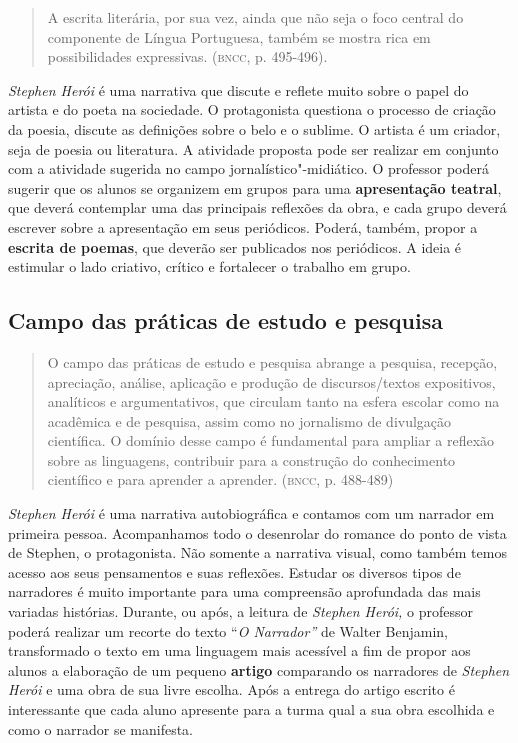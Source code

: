 \documentclass[12pt]{extarticle}
\begin{document}
{\begin{quote}
A escrita literária, por sua vez, ainda que não seja o foco central do
componente de Língua Portuguesa, também se mostra rica em possibilidades
expressivas. (\textsc{bncc}, p. 495-496).
\end{quote}

\emph{Stephen Herói} é uma narrativa que discute e reflete muito sobre
o papel do artista e do poeta na sociedade. O protagonista questiona o
processo de criação da poesia, discute as definições sobre o belo e o
sublime. O artista é um criador, seja de poesia ou literatura. A
atividade proposta pode ser realizar em conjunto com a atividade
sugerida no campo jornalístico"-midiático. O professor poderá sugerir
que os alunos se organizem em grupos para uma \textbf{apresentação
teatral}, que deverá contemplar uma das principais reflexões da obra,
e cada grupo deverá escrever sobre a apresentação em seus periódicos.
Poderá, também, propor a \textbf{escrita de poemas}, que deverão ser
publicados nos periódicos. A ideia é estimular o lado criativo,
crítico e fortalecer o trabalho em grupo.

\subsection{Campo das práticas de estudo e pesquisa}

\begin{quote}
O campo das práticas de estudo e pesquisa abrange a pesquisa,
recepção, apreciação, análise, aplicação e produção de discursos/textos
expositivos, analíticos e argumentativos, que circulam tanto na esfera
escolar como na acadêmica e de pesquisa, assim como no jornalismo de
divulgação científica. O domínio desse campo é fundamental para ampliar
a reflexão sobre as linguagens, contribuir para a construção do
conhecimento científico e para aprender a aprender. (\textsc{bncc}, p. 488-489)
\end{quote}


\emph{Stephen Herói} é uma narrativa autobiográfica e contamos com um
narrador em primeira pessoa. Acompanhamos todo o desenrolar do romance
do ponto de vista de Stephen, o protagonista. Não somente a narrativa
visual, como também temos acesso aos seus pensamentos e suas reflexões.
Estudar os diversos tipos de narradores é muito importante para uma
compreensão aprofundada das mais variadas histórias. Durante, ou após, a
leitura de \emph{Stephen Herói,} o professor poderá realizar um recorte
do texto ``\emph{O Narrador''} de Walter Benjamin, transformado o texto
em uma linguagem mais acessível a fim de propor aos alunos a elaboração
de um pequeno \textbf{artigo} comparando os narradores de \emph{Stephen
Herói} e uma obra de sua livre escolha. Após a entrega do artigo escrito
é interessante que cada aluno apresente para a turma qual a sua obra
escolhida e como o narrador se manifesta.

}
\end{document}

